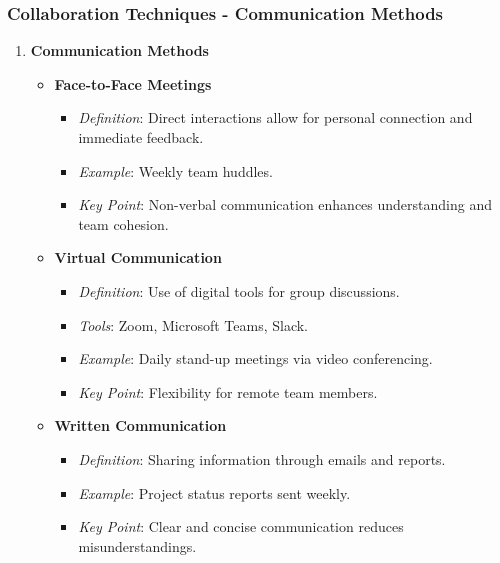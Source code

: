 \documentclass[aspectratio=169]{beamer}
\begin{document}
\begin{frame}[fragile]
    \frametitle{Collaboration Techniques - Communication Methods}
    \begin{enumerate}
        \item \textbf{Communication Methods}
        \begin{itemize}
            \item \textbf{Face-to-Face Meetings}
            \begin{itemize}
                \item \textit{Definition}: Direct interactions allow for personal connection and immediate feedback.
                \item \textit{Example}: Weekly team huddles.
                \item \textit{Key Point}: Non-verbal communication enhances understanding and team cohesion.
            \end{itemize}
            \item \textbf{Virtual Communication}
            \begin{itemize}
                \item \textit{Definition}: Use of digital tools for group discussions.
                \item \textit{Tools}: Zoom, Microsoft Teams, Slack.
                \item \textit{Example}: Daily stand-up meetings via video conferencing.
                \item \textit{Key Point}: Flexibility for remote team members.
            \end{itemize}
            \item \textbf{Written Communication}
            \begin{itemize}
                \item \textit{Definition}: Sharing information through emails and reports.
                \item \textit{Example}: Project status reports sent weekly.
                \item \textit{Key Point}: Clear and concise communication reduces misunderstandings.
            \end{itemize}
        \end{itemize}
    \end{enumerate}
\end{frame}
\end{document}
